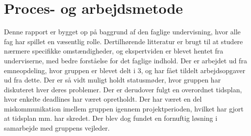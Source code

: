 \section{Proces- og arbejdsmetode}
Denne rapport er bygget op på baggrund af den faglige undervisning, hvor alle fag har spillet en væsentlig rolle. Dertilhørende litteratur er brugt til at studere nærmere specifikke omstændigheder, og ekspertviden er blevet hentet fra underviserne, med bedre forståelse for det faglige indhold. Der er arbejdet ud fra emneopdeling, hvor gruppen er blevet delt i 3, og har fået tildelt arbejdsopgaver ud fra dette. Der er så vidt muligt holdt statusmøder, hvor gruppen har diskuteret hver deres problemer. Der er derudover fulgt en overordnet tidsplan, hvor enkelte deadlines har været opretholdt. Der har været en del miskommunikation imellem gruppen igennem projektperioden, hvilket har gjort at tidsplan mm. har skredet. Der blev dog fundet en fornuftig løsning i samarbejde med gruppens vejleder.



